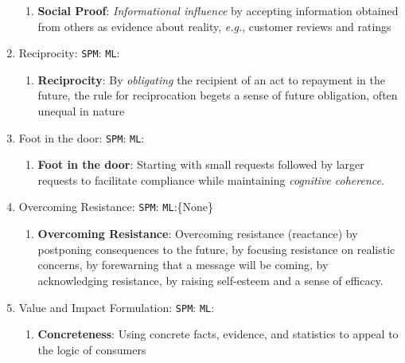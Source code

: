 \begin{enumerate}
\begin{enumerate}
        \item \textbf{Social Proof}: \textit{Informational influence} by accepting information obtained from others as evidence about reality, \textit{e.g.}, customer reviews and ratings 
    \end{enumerate}

    \item  Reciprocity: \texttt{SPM}:\cite{regan1971effects,cialdini2007influence,clark1984record,clark1979interpersonal,clark1986keeping} \texttt{ML}:\cite{anand2011believe,iyer2019unsupervised,althoff2014ask,ChenYang2021,shaikh-etal-2020-examining}
    \begin{enumerate}
        \item \textbf{Reciprocity}: By \textit{obligating} the recipient of an act to repayment in the future, the rule for reciprocation begets a sense of future obligation, often unequal in nature
    \end{enumerate}

    \item Foot in the door: \texttt{SPM}: \cite{freedman1966compliance,burger1999foot,cialdini2007influence} \texttt{ML}:\cite{chen2021weakly,wang-etal-2019-persuasion,vargheese2020exploring}
    \begin{enumerate}
        \item \textbf{Foot in the door}: Starting with small requests followed by larger requests to facilitate compliance while maintaining \textit{cognitive coherence}.
    \end{enumerate}

    \item  Overcoming Resistance: \texttt{SPM}:\cite{mcguire1961relative,knowles2004resistance,mcguire1964inducing} \texttt{ML}:\{None\}
    \begin{enumerate}
        \item \textbf{Overcoming Resistance}: Overcoming resistance (reactance) by postponing consequences to the future, by focusing resistance on realistic concerns, by forewarning that a message will be coming, by acknowledging resistance, by raising self-esteem and a sense of efficacy. 
    \end{enumerate}


    \item  Value and Impact Formulation: \texttt{SPM}:\cite{lee2010value,furnham2011literature,wegener2001implications,tversky1974judgment,strack1997explaining,bhattacharya2003consumer} \texttt{ML}:\cite{zhang2017characterizing,longpre2019persuasion}
    \begin{enumerate}
        \item \textbf{Concreteness}: Using concrete facts, evidence, and statistics to appeal to the logic of consumers 


\end{enumerate}
\end{enumerate}
